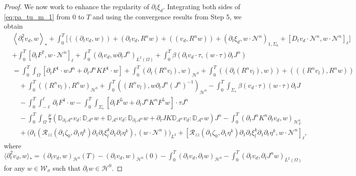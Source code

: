 \documentclass[letterpaper,reqno,10pt,twoside]{amsart}
\theoremstyle{definition}
\theoremstyle{remark}
\def\p{\partial}
\def\Om{\Omega}
\begin{document}
\begin{proof}
		We now work to enhance the regularity of $\partial_{t}\xi_{d}$. Integrating both sides of \eqref{eq:pa_tu_m_1} from $0$ to $T$ and using the convergence results from Step 5, we obtain 
		\begin{equation}\label{eq:4th}
			\begin{aligned}
				&\left<\p_t^2v_{d}, w\right>_{\ast}+\int_0^T\Big[((\p_tv_{d},w))+(\partial_{t}v_{d},R^{n}w)+((v_{d},R^{n}w))+(\p_t\xi_{d},w\cdot\mathcal{N}^{n})_{1,\Sigma_{k}}+[D_tv_{d}\cdot\mathcal{N}^{n},w\cdot\mathcal{N}^{n}]_\ell\Big]\\
				&+\int_{0}^{T}[\p_tF^7,w\cdot\mathcal{N}^{n}]_\ell+\int_{0}^{T}(\partial_{t}v_{d},w \partial_{t}J^{n})_{L^2(\Omega)}+\int_{0}^{T}\beta(\partial_{t}v_{d}\cdot \tau,(w \cdot \tau)\partial_{t}J^{n})\\
				&=\int_0^T\int_{\Om}\left[\p_tF^1\cdot wJ^{n}+\p_tJ^{n}KF^1\cdot w\right]+\int_{0}^{T}(\p_{t}(R^{n}v_{l}),w)_{\mathcal{H}^{0}}+\int_{0}^{T}((\p_{t}(R^{n}v_{l}),w))+(((R^{n}v_{l}),R^{n}w))\\
				&\quad +\int_{0}^{T}((R^{n}v_{l}),R^{n}w)_{\mathcal{H}^{0}}+\int_{0}^{T}((R^{n}v_{l}),w\p_{t}J^{n}(J^{n})^{-1})_{\mathcal{H}^{0}} -\int_0^T\int_{\Sigma_s}\beta(v_{d}\cdot\tau)(w\cdot\tau)\p_tJ\\
				&\quad-\int_0^T\int_{-\ell}^{\ell}\p_tF^4\cdot w-\int_0^T\int_{\Sigma_s}\left[\p_tF^5 w+\p_tJ^{n}K^{n}F^5w\right]\cdot\tau J^{n}\\
				&\quad-\int_0^T\int_\Om\frac{\mu}{2}(\mathbb{D}_{\p_t\mathcal{A}^{n}}v_{d}:\mathbb{D}_{\mathcal{A}^{n}}w+\mathbb{D}_{\mathcal{A}^{n}}v_{d}:\mathbb{D}_{\p_t\mathcal{A}^{n}}w+\p_tJK\mathbb{D}_{\mathcal{A}^{n}}v_{d}:\mathbb{D}_{\mathcal{A}^{n}}w)J^{n}-\int_{0}^{T}(\p_tJ^{n}K^{n}\p_tv_{d}, w)_{\mathcal{H}^0_T}\\
				&\quad+\big(\p_{1}(\mathcal{R}_{zz}(\p_{1}\zeta_{0},\p_{1}\eta^{k})\p_{1}\p_{t}\xi_{l}^{k}\p_{1}\p_{t}\eta^{k}),(w\cdot \mathcal{N}^{n})\big)_{L^{2}}+[\mathcal{R}_{zz}(\p_{1}\zeta_{0},\p_{1}\eta^{k})\p_{1}\p_{t}\xi_{l}^{k}\p_{1}\p_{t}\eta^{k},w\cdot \mathcal{N}^{n}]_{\ell},
			\end{aligned}
		\end{equation}
		where
		$\langle\partial_{t}^{2}v_{d},w\rangle_{*}=(\partial_{t}v_{d},w)_{\mathcal{H}^{0}}(T)-(\partial_{t}v_{d},w)_{\mathcal{H}^{0}}(0)-\int_{0}^{T}(\partial_{t}v_{d},\p_{t} w)_{\mathcal{H}^{0}}-\int_{0}^{T}(\p_{t}v_{d},\p_{t}J^{n}w)_{L^{2}(\Omega)}
		$ for any $w\in \mathcal{W}_{\sigma}$ such that $\p_{t}w\in \mathcal{H}^{0}$.
		

\end{proof}
\end{document}
